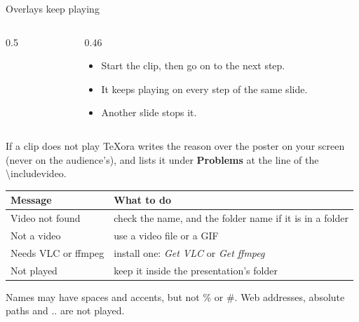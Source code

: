 \documentclass[aspectratio=169]{beamer}
\newcommand{\code}[1]{{\small\ttfamily #1}}
\begin{document}
\begin{frame}{Overlays keep playing}
  \begin{columns}[c]
    \begin{column}{0.5\textwidth}
    \end{column}
    \begin{column}{0.46\textwidth}
      \begin{itemize}
        \item Start the clip, then go on to the next step.\pause
        \item It keeps playing on every step of the same slide.\pause
        \item Another slide stops it.
      \end{itemize}
    \end{column}
  \end{columns}
\end{frame}

\begin{frame}{If a clip does not play}
  TeXora writes the reason over the poster on your screen (never on the audience's), and lists it
  under \textbf{Problems} at the line of the \code{\textbackslash includevideo}.
  \par\medskip
  \begin{tabular}{@{}ll@{}}
    \toprule
    \textbf{Message} & \textbf{What to do} \\
    \midrule
    Video not found & check the name, and the folder name if it is in a folder \\
    Not a video & use a video file or a GIF \\
    Needs VLC or ffmpeg & install one: \emph{Get VLC} or \emph{Get ffmpeg} \\
    Not played & keep it inside the presentation's folder \\
    \bottomrule
  \end{tabular}
  \par\medskip
  \small Names may have spaces and accents, but not \code{\%} or \code{\#}.
  Web addresses, absolute paths and \code{..} are not played.
\end{frame}
\end{document}

